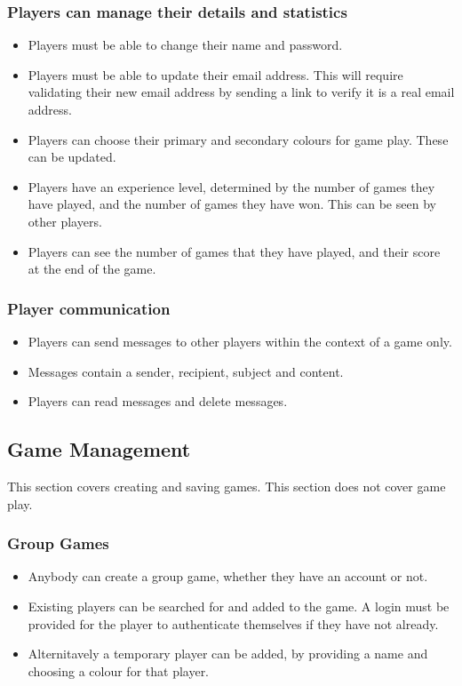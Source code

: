 	\subsubsection{Players can manage their details and statistics}
	  \begin{itemize}
	  	\item \pB Players must be able to change their name and password.
	  	\item \pD Players must be able to update their email address. This will require validating their new email address by sending a link to verify it is a real email address.
	  	\item \pB Players can choose their primary and secondary colours for game play. These can be updated.
	  	\item \pB Players have an experience level, determined by the number of games they have played, and the number of games they have won. This can be seen by other players.
	  	\item \pD Players can see the number of games that they have played, and their score at the end of the game.
	  \end{itemize}
	\subsubsection{Player communication}
	  \begin{itemize}
	  	\item \pD Players can send messages to other players within the context of a game only.
	  	\item \pD Messages contain a sender, recipient, subject and content.
	  	\item \pD Players can read messages and delete messages.
	  \end{itemize}

\subsection{Game Management}
This section covers creating and saving games. This section does not cover game play.
	\subsubsection{Group Games}
	  \begin{itemize}
	  	\item \pC Anybody can create a group game, whether they have an account or not.
	  	\item \pC Existing players can be searched for and added to the game. A login must be provided for the player to authenticate themselves if they have not already.
	  	\item \pC Alternitavely a temporary player can be added, by providing a name and choosing a colour for that player.
	  \end{itemize}
